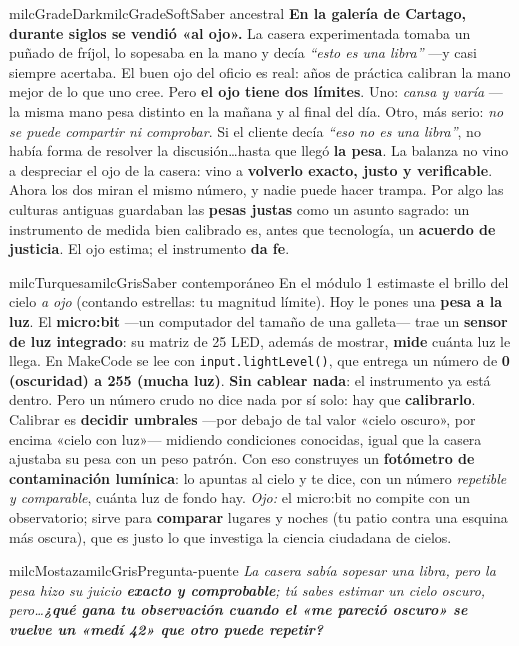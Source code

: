\documentclass[11pt,letterpaper]{article}
\begin{document}
\begin{softbox}{milcGradeDark}{milcGradeSoft}{Saber ancestral}
\textbf{En la galería de Cartago, durante siglos se vendió «al ojo».} La casera experimentada tomaba un puñado de fríjol, lo sopesaba en la mano y decía \emph{``esto es una libra''} ---y casi siempre acertaba. El buen ojo del oficio es real: años de práctica calibran la mano mejor de lo que uno cree. Pero \textbf{el ojo tiene dos límites}. Uno: \emph{cansa y varía} ---la misma mano pesa distinto en la mañana y al final del día. Otro, más serio: \emph{no se puede compartir ni comprobar}. Si el cliente decía \emph{``eso no es una libra''}, no había forma de resolver la discusión\ldots hasta que llegó \textbf{la pesa}. La balanza no vino a despreciar el ojo de la casera: vino a \textbf{volverlo exacto, justo y verificable}. Ahora los dos miran el mismo número, y nadie puede hacer trampa. Por algo las culturas antiguas guardaban las \textbf{pesas justas} como un asunto sagrado: un instrumento de medida bien calibrado es, antes que tecnología, un \textbf{acuerdo de justicia}. El ojo estima; el instrumento \textbf{da fe}.
\end{softbox}

\begin{softbox}{milcTurquesa}{milcGris}{Saber contemporáneo}
En el módulo 1 estimaste el brillo del cielo \emph{a ojo} (contando estrellas: tu magnitud límite). Hoy le pones una \textbf{pesa a la luz}. El \textbf{micro:bit} ---un computador del tamaño de una galleta--- trae un \textbf{sensor de luz integrado}: su matriz de 25 LED, además de mostrar, \textbf{mide} cuánta luz le llega. En MakeCode se lee con \texttt{input.lightLevel()}, que entrega un número de \textbf{0 (oscuridad) a 255 (mucha luz)}. \textbf{Sin cablear nada}: el instrumento ya está dentro. Pero un número crudo no dice nada por sí solo: hay que \textbf{calibrarlo}. Calibrar es \textbf{decidir umbrales} ---por debajo de tal valor «cielo oscuro», por encima «cielo con luz»--- midiendo condiciones conocidas, igual que la casera ajustaba su pesa con un peso patrón. Con eso construyes un \textbf{fotómetro de contaminación lumínica}: lo apuntas al cielo y te dice, con un número \emph{repetible y comparable}, cuánta luz de fondo hay. \emph{Ojo:} el micro:bit no compite con un observatorio; sirve para \textbf{comparar} lugares y noches (tu patio contra una esquina más oscura), que es justo lo que investiga la ciencia ciudadana de cielos.
\end{softbox}

\begin{softbox}{milcMostaza}{milcGris}{Pregunta-puente}
\textit{La casera sabía sopesar una libra, pero la pesa hizo su juicio \textbf{exacto y comprobable}; tú sabes estimar un cielo oscuro, pero\ldots \textbf{¿qué gana tu observación cuando el «me pareció oscuro» se vuelve un «medí 42» que otro puede repetir?}}
\end{softbox}
\end{document}
